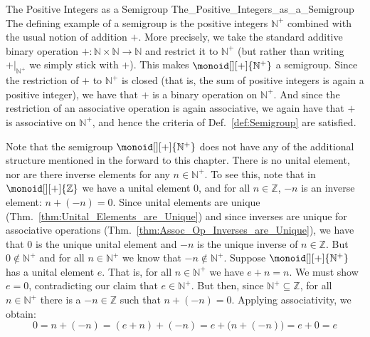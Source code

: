         \begin{fexample}{The Positive Integers as a Semigroup}
                        {The_Positive_Integers_as_a_Semigroup}
            The defining example of a semigroup is the positive integers
            $\mathbb{N}^{+}$ combined with the usual notion of addition $+$.
            More precisely, we take the standard additive binary operation
            $+:\mathbb{N}\times\mathbb{N}\rightarrow\mathbb{N}$ and restrict it
            to $\mathbb{N}^{+}$ (but rather than writing $+|_{\mathbb{N}^{+}}$
            we simply stick with $+$). This makes $\monoid[][+]{\mathbb{N}^{+}}$
            a semigroup. Since the restriction of $+$ to $\mathbb{N}^{+}$ is
            closed (that is, the sum of positive integers is again a positive
            integer), we have that $+$ is a binary operation on
            $\mathbb{N}^{+}$. And since the restriction of an associative
            operation is again associative, we again have that $+$ is
            associative on $\mathbb{N}^{+}$, and hence the criteria of
            Def.~\ref{def:Semigroup} are satisfied.
        \end{fexample}
        Note that the semigroup $\monoid[][+]{\mathbb{N}^{+}}$ does not have any
        of the additional structure mentioned in the forward to this chapter.
        There is no unital element, nor are there inverse elements for any
        $n\in\mathbb{N}^{+}$. To see this, note that in
        $\monoid[][+]{\mathbb{Z}}$ we have a unital element 0, and for all
        $n\in\mathbb{Z}$, $\minus{n}$ is an inverse element: $n+(\minus{n})=0$.
        Since unital elements are unique
        (Thm.~\ref{thm:Unital_Elements_are_Unique}) and since inverses are
        unique for associative operations
        (Thm.~\ref{thm:Assoc_Op_Inverses_are_Unique}), we have that 0 is the
        unique unital element and $\minus{n}$ is the unique inverse of
        $n\in\mathbb{Z}$. But $0\notin\mathbb{N}^{+}$ and for all
        $n\in\mathbb{N}^{+}$ we know that $\minus{n}\notin\mathbb{N}^{+}$.
        Suppose $\monoid[][+]{\mathbb{N}^{+}}$ has a unital element $e$. That
        is, for all $n\in\mathbb{N}^{+}$ we have $e+n=n$. We must show $e=0$,
        contradicting our claim that $e\in\mathbb{N}^{+}$. But then, since
        $\mathbb{N}^{+}\subseteq\mathbb{Z}$, for all $n\in\mathbb{N}^{+}$ there
        is a $\minus{n}\in\mathbb{Z}$ such that $n+(\minus{n})=0$. Applying
        associativity, we obtain:
        \begin{equation}
            0=n+(\minus{n})=(e+n)+(\minus{n})=e+\big(n+(\minus{n})\big)=e+0=e
        \end{equation}
